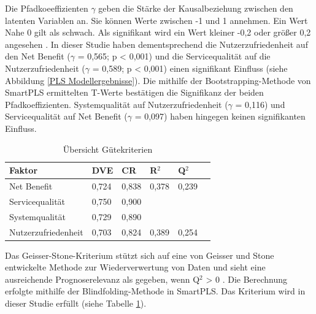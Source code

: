Die Pfadkoeeffizienten $\gamma$ geben die Stärke der Kausalbeziehung zwischen den latenten Variablen an. Sie können Werte zwischen -1 und 1 annehmen. Ein Wert Nahe 0 gilt als schwach. Als signifikant wird ein Wert kleiner -0,2 oder größer 0,2 angesehen \parencite[vgl.][S.11]{chin1998commentary}. In dieser Studie haben dementsprechend die Nutzerzufriedenheit auf den Net Benefit ($\gamma$ = 0,565; p < 0,001) und die Servicequalität auf die Nutzerzufriedenheit ($\gamma$ = 0,589; p < 0,001) einen signifikant Einfluss (siehe Abbildung \ref{PLS Modellergebnisse}). Die mithilfe der Bootstrapping-Methode von SmartPLS ermittelten T-Werte bestätigen die Signifikanz der beiden Pfadkoeffizienten. Systemqualität auf Nutzerzufriedenheit ($\gamma$ = 0,116) und Servicequalität auf Net Benefit ($\gamma$ = 0,097) haben hingegen keinen signifikanten Einfluss. 

\nocite{geisser1974predictive}

\begin{table}[h] 
\footnotesize
\caption{Übersicht Gütekriterien}
\label{tab:Übersicht Gütekriterien} 
\begin{tabular}{@{}llllll@{}} \toprule

\textbf{Faktor} & \textbf{DVE} & \textbf{CR} & \textbf{R$^2$} & \textbf{Q$^2$} \\ \midrule

 Net Benefit 		& 0,724 		& 0,838 		& 0,378 		& 0,239 		 \\
 
 Servicequalität 	& 0,750 		& 0,900 		& 			& 			 \\

 Systemqualität 	& 0,729 		& 0,890 		& 			& 			 \\

 Nutzerzufriedenheit & 0,703 	& 0,824 		& 0,389 		& 0,254		 \\ \bottomrule
\end{tabular}	
\end{table}



Das Geisser-Stone-Kriterium stützt sich auf eine von Geisser und Stone entwickelte Methode zur Wiederverwertung von Daten und sieht eine ausreichende Prognoserelevanz als gegeben, wenn Q$^2$ > 0 \parencite[vgl.][S.35]{nitzl2010anwenderorientierte}. Die Berechnung erfolgte mithilfe der Blindfolding-Methode in SmartPLS. Das Kriterium wird in dieser Studie erfüllt (siehe Tabelle \ref{tab:Übersicht Gütekriterien}).
 














